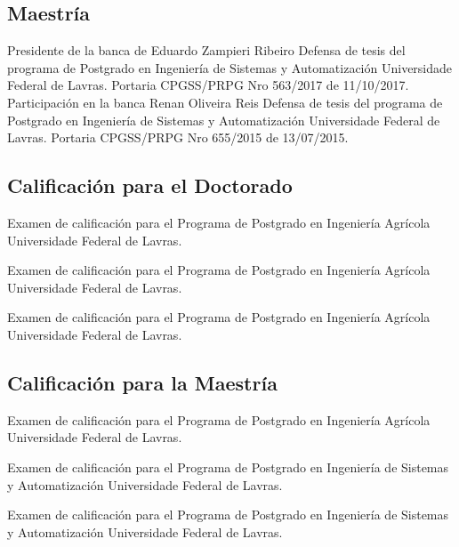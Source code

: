 \documentclass[11pt,a4paper,sans]{moderncv} %
\begin{document}
\subsection{Maestría}
			{Presidente de la banca de Eduardo Zampieri Ribeiro}
			{Defensa de tesis del programa de Postgrado en Ingeniería de Sistemas y Automatización}{}
			{Universidade Federal de Lavras. Portaria CPGSS/PRPG Nro 563/2017 de 11/10/2017.}
			{Participación en la banca Renan Oliveira Reis}
			{Defensa de tesis del programa de Postgrado en Ingeniería de Sistemas y Automatización}{}
			{Universidade Federal de Lavras. Portaria CPGSS/PRPG Nro 655/2015 de 13/07/2015.}

\subsection{Calificación para el Doctorado}
			{}
			{Examen de calificación para el Programa de Postgrado en Ingeniería Agrícola}{}
			{Universidade Federal de Lavras.}

			{}
			{Examen de calificación para el Programa de Postgrado en Ingeniería Agrícola}{}
			{Universidade Federal de Lavras.}

			{}
			{Examen de calificación para el Programa de Postgrado en Ingeniería Agrícola}{}
			{Universidade Federal de Lavras.}
			
\subsection{Calificación para la Maestría}
			{}
			{Examen de calificación para el Programa de Postgrado en Ingeniería Agrícola}{}
			{Universidade Federal de Lavras.}

			{}
			{Examen de calificación para el Programa de Postgrado en Ingeniería de Sistemas y Automatización}{}
			{Universidade Federal de Lavras.}

			{}
			{Examen de calificación para el Programa de Postgrado en Ingeniería de Sistemas y Automatización}{}
			{Universidade Federal de Lavras.}
\end{document}
